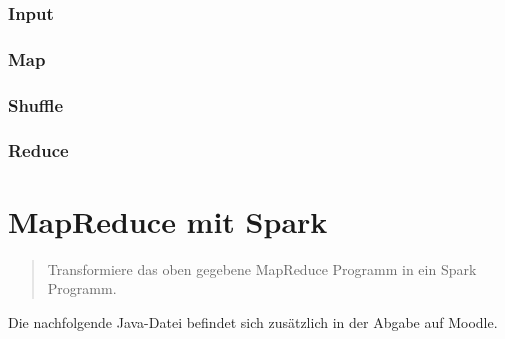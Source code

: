 \subsubsection{Input}


\subsubsection{Map}


\subsubsection{Shuffle}


\subsubsection{Reduce}


\section{MapReduce mit Spark}
\begin{quote}
    Transformiere das oben gegebene MapReduce Programm in ein Spark Programm.
\end{quote}
Die nachfolgende Java-Datei befindet sich zusätzlich in der Abgabe auf Moodle.

